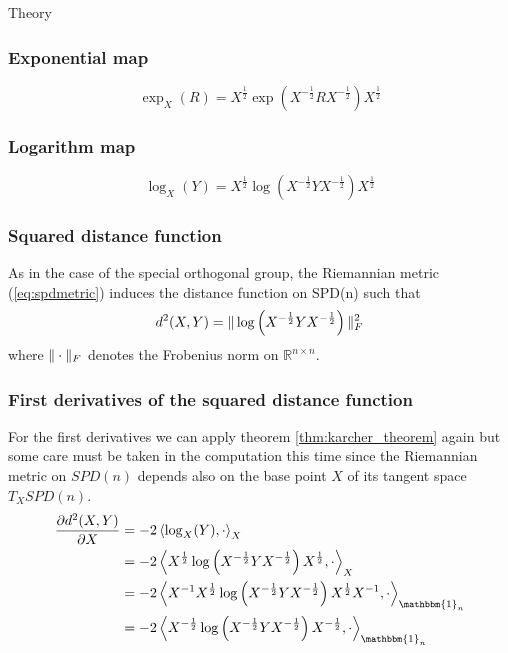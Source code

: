 \begin{chapter}{Theory}
\subsubsection{Exponential map} %
\label{ssub:ExponentialSPD}
\begin{equation}
    \exp_X(R)=X^{\frac{1}{2}}\exp\left(X^{-\frac{1}{2}}RX^{-\frac{1}{2}}\right)X^{\frac{1}{2}}
\end{equation}

\subsubsection{Logarithm map} %
\label{ssub:LogarithmSPD}
\begin{equation}
    \log_X(Y)=X^{\frac{1}{2}}\log\left(X^{-\frac{1}{2}}YX^{-\frac{1}{2}}\right)X^{\frac{1}{2}}
\end{equation}

\subsubsection{Squared distance function} %
\label{ssub:SquareddistanceSPD}
As in the case of the special orthogonal group, the Riemannian metric (\ref{eq:spdmetric}) induces the distance function on SPD(n) such that
\begin{equation}
    d^2(X,Y)=\| \log\left(X^{-\frac{1}{2}}YX^{-\frac{1}{2}}\right) \|_F^2
\end{equation}
where $\| \cdot \|_F$ denotes the Frobenius norm on $\mathbb{R}^{n\times n}$.

\subsubsection{First derivatives of the squared distance function} %
\label{ssub:First derivatives of the squared distance function}
For the first derivatives we can apply theorem \ref{thm:karcher_theorem} again but some care must be taken in the computation this time since the Riemannian metric on $SPD(n)$ depends also on the base point $X$ of its tangent space $T_XSPD(n)$.
\begin{align}
    \frac{\partial d^2(X,Y)}{\partial X} &= -2\braket{\log_X(Y),\cdot}_{X}\\
    &= -2 \braket{X^{\frac{1}{2}}\log\left(X^{-\frac{1}{2}}YX^{-\frac{1}{2}}\right)X^{\frac{1}{2}},\cdot}_{X} \\
    &= -2 \braket{X^{-1}X^{\frac{1}{2}}\log\left(X^{-\frac{1}{2}}YX^{-\frac{1}{2}}\right)X^{\frac{1}{2}}X^{-1},\cdot}_{\mathbbm{1}_n} \\
    &= -2 \braket{X^{-\frac{1}{2}}\log\left( X^{-\frac{1}{2}}YX^{-\frac{1}{2}}\right)X^{-\frac{1}{2}},\cdot}_{\mathbbm{1}_n} 
\end{align}


\end{chapter}
